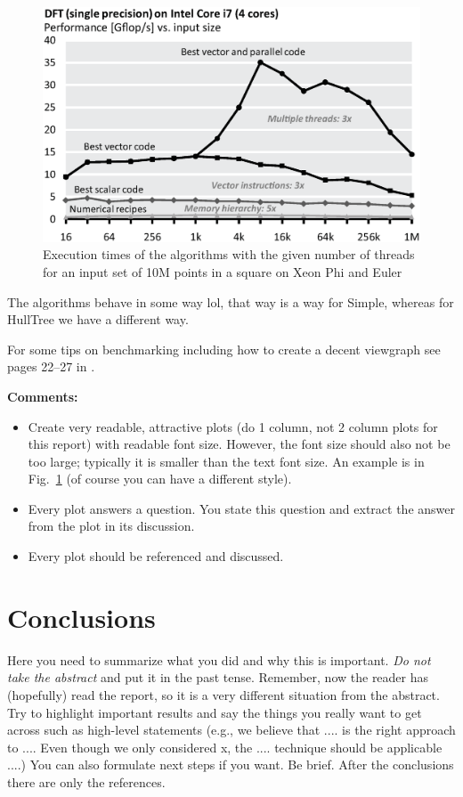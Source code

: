\documentclass[letterpaper]{article}
\begin{document}
\begin{figure}[!ht]\centering
  \includegraphics[scale=0.33]{dft-performance.eps}
  \caption{Execution times of the algorithms with the given number of threads for an input set of 10M points in a square on Xeon Phi and Euler\label{fftperf}}
\end{figure}

The algorithms behave in some way lol, that way is a way for Simple, whereas for HullTree we have a different way.

For some tips on benchmarking including how to create a decent viewgraph see pages 22--27 in \cite{Pueschel:10}.

{\bf Comments:}
\begin{itemize}
\item Create very readable, attractive plots (do 1 column, not 2 column plots
for this report) with readable font size. However, the font size should also not be too large; typically it is smaller than the text font size.
An example is in Fig.~\ref{fftperf} (of course you can have a different style).
\item Every plot answers a question. You state this question and extract the
answer from the plot in its discussion.
\item Every plot should be referenced and discussed.
\end{itemize}

\section{Conclusions}

Here you need to summarize what you did and why this is
important. {\em Do not take the abstract} and put it in the past
tense. Remember, now the reader has (hopefully) read the report, so it
is a very different situation from the abstract. Try to highlight
important results and say the things you really want to get across
such as high-level statements (e.g., we believe that .... is the right
approach to .... Even though we only considered x, the
.... technique should be applicable ....) You can also formulate next
steps if you want. Be brief. After the conclusions there are only the references.
\end{document}
